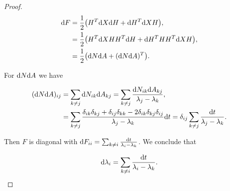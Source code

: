 \begin{proof}
\begin{align*}
    \mathrm d F &= \frac12 \bigl( H^T\mathrm d X \mathrm d H + \mathrm d H^T\mathrm d X H \bigr),\\
         &= \frac12 \bigl( H^T\mathrm d X H H^T \mathrm d H + \mathrm d H^THH^T\mathrm d X H \bigr),\\
         &= \frac12 \bigl( \mathrm d N \mathrm d A + (\mathrm d N \mathrm d A)^T \bigr).
\end{align*}

For $\mathrm d N \mathrm d A$ we have

\begin{align*}
    (\mathrm d N \mathrm d A)_{ij} &= \sum_{k\neq j} \mathrm d N_{ik}\mathrm d A_{kj} = \sum_{k\neq j} \frac{\mathrm d N_{ik}\mathrm d A_{kj}}{\lambda_j - \lambda_k},\\
    &= \sum_{k\neq j} \frac{ \delta_{ik}\delta_{kj} + \delta_{ij}\delta_{kk} - 2\delta_{ik}\delta_{kj}\delta_{ij} }{\lambda_j - \lambda_k}\mathrm d t = \delta_{ij}\sum_{k\neq j} \frac{ \mathrm d t }{\lambda_j - \lambda_k}.
\end{align*}

Then $F$ is diagonal with $\mathrm d F_{ii} = \sum_{k\neq i} \frac{\mathrm d t}{\lambda_i - \lambda_k}$. We conclude that

\begin{equation*}
    \mathrm d \lambda_i = \sum_{k\neq i} \frac{\mathrm d t}{\lambda_i - \lambda_k}.
\end{equation*}

\end{proof}